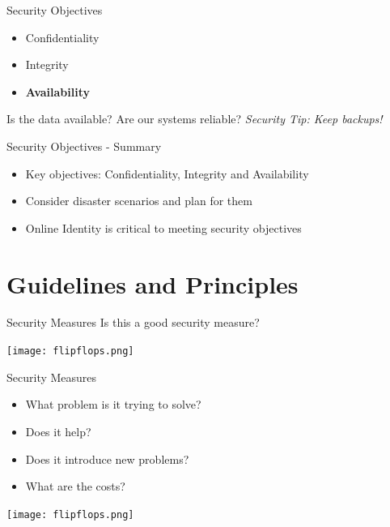 \documentclass[aspectratio=169]{beamer}
\begin{document}
\begin{frame}{Security Objectives}
	\begin{itemize}
		\item Confidentiality
		\item Integrity
        \item \textbf{Availability}
	\end{itemize}
    Is the data available? Are our systems reliable?
	\linebreak
    \linebreak
    { \color{red} \textit{Security Tip: Keep backups!} }
\end{frame}


\begin{frame}{Security Objectives - Summary}
\begin{itemize}
\item Key objectives: Confidentiality, Integrity and Availability
\item Consider disaster scenarios and plan for them 
\item Online Identity is critical to meeting security objectives
\end{itemize}
\end{frame}

\section{Guidelines and Principles}
\frame{\sectionpage}

\begin{frame}{Security Measures}
Is this a good security measure?
\begin{center}
\texttt{[image: flipflops.png]}
\end{center}
\end{frame}

\begin{frame}{Security Measures}
\begin{itemize}
 \item What problem is it trying to solve? 
 \item Does it help? 
 \item Does it introduce new problems? 
 \item What are the costs?
 \end{itemize} 
 \begin{center}
	\texttt{[image: flipflops.png]} 
 \end{center}
\end{frame}
\end{document}
